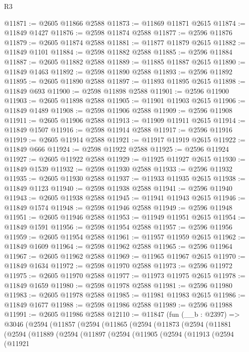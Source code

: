 \begin{lexlean}{R3}
\begin{coremodule}
@11871 := @2605 @11866 @2588
@11873 := @11869 @11871 @2615
@11874 := @11849 @1427
@11876 := @2598 @11874 @2588
@11877 := @2596 @11876
@11879 := @2605 @11874 @2588
@11881 := @11877 @11879 @2615
@11882 := @11849 @1101
@11884 := @2598 @11882 @2588
@11885 := @2596 @11884
@11887 := @2605 @11882 @2588
@11889 := @11885 @11887 @2615
@11890 := @11849 @1463
@11892 := @2598 @11890 @2588
@11893 := @2596 @11892
@11895 := @2605 @11890 @2588
@11897 := @11893 @11895 @2615
@11898 := @11849 @693
@11900 := @2598 @11898 @2588
@11901 := @2596 @11900
@11903 := @2605 @11898 @2588
@11905 := @11901 @11903 @2615
@11906 := @11849 @1489
@11908 := @2598 @11906 @2588
@11909 := @2596 @11908
@11911 := @2605 @11906 @2588
@11913 := @11909 @11911 @2615
@11914 := @11849 @1507
@11916 := @2598 @11914 @2588
@11917 := @2596 @11916
@11919 := @2605 @11914 @2588
@11921 := @11917 @11919 @2615
@11922 := @11849 @666
@11924 := @2598 @11922 @2588
@11925 := @2596 @11924
@11927 := @2605 @11922 @2588
@11929 := @11925 @11927 @2615
@11930 := @11849 @1539
@11932 := @2598 @11930 @2588
@11933 := @2596 @11932
@11935 := @2605 @11930 @2588
@11937 := @11933 @11935 @2615
@11938 := @11849 @1123
@11940 := @2598 @11938 @2588
@11941 := @2596 @11940
@11943 := @2605 @11938 @2588
@11945 := @11941 @11943 @2615
@11946 := @11849 @1574
@11948 := @2598 @11946 @2588
@11949 := @2596 @11948
@11951 := @2605 @11946 @2588
@11953 := @11949 @11951 @2615
@11954 := @11849 @1591
@11956 := @2598 @11954 @2588
@11957 := @2596 @11956
@11959 := @2605 @11954 @2588
@11961 := @11957 @11959 @2615
@11962 := @11849 @1609
@11964 := @2598 @11962 @2588
@11965 := @2596 @11964
@11967 := @2605 @11962 @2588
@11969 := @11965 @11967 @2615
@11970 := @11849 @1634
@11972 := @2598 @11970 @2588
@11973 := @2596 @11972
@11975 := @2605 @11970 @2588
@11977 := @11973 @11975 @2615
@11978 := @11849 @1659
@11980 := @2598 @11978 @2588
@11981 := @2596 @11980
@11983 := @2605 @11978 @2588
@11985 := @11981 @11983 @2615
@11986 := @11849 @1677
@11988 := @2598 @11986 @2588
@11989 := @2596 @11988
@11991 := @2605 @11986 @2588
@12110 := @11847
    (fun (__b : @2397) =>
    @3046
      (@2594
        (@11857
          (@2594
            (@11865
              (@2594
                (@11873
                  (@2594
                    (@11881
                      (@2594
                        (@11889
                          (@2594
                            (@11897
                              (@2594
                                (@11905
                                  (@2594
                                    (@11913
                                      (@2594
                                        (@11921

\end{coremodule}
\end{lexlean}
